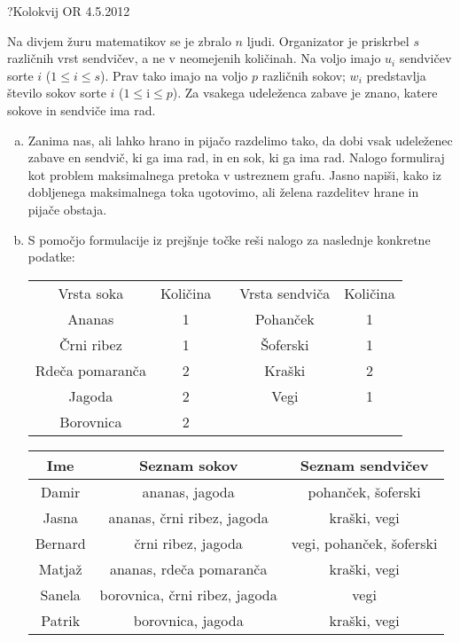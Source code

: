 \begin{naloga}{?}{Kolokvij OR 4.5.2012}
\begin{vprasanje}
Na divjem žuru matematikov se je zbralo $n$ ljudi.
Organizator je priskrbel $s$ različnih vrst sendvičev,
a ne v neomejenih količinah.
Na voljo imajo $u_i$ sendvičev sorte $i$ ($1 \le i \le s$).
Prav tako imajo na voljo $p$ različnih sokov;
$w_i$ predstavlja število sokov sorte $i$ ($1 \le $i$ \le p$).
Za vsakega udeleženca zabave je znano,
katere sokove in sendviče ima rad.

\begin{enumerate}[(a)]
\item Zanima nas, ali lahko hrano in pijačo razdelimo tako,
da dobi vsak udeleženec zabave en sendvič, ki ga ima rad,
in en sok, ki ga ima rad.
Nalogo formuliraj kot problem maksimalnega pretoka v ustreznem grafu.
Jasno napiši, kako iz dobljenega maksimalnega toka ugotovimo,
ali želena razdelitev hrane in pijače obstaja.

\item S pomočjo formulacije iz prejšnje točke
reši nalogo za naslednje konkretne podatke:
\begin{center}
\begin{tabular}{c|ccc|c}
Vrsta soka & Količina & \quad & Vrsta sendviča & Količina \\
\cline{1-2} \cline{4-5}
Ananas          & 1 && Pohanček & 1 \\
Črni ribez      & 1 && Šoferski & 1 \\
Rdeča pomaranča & 2 && Kraški   & 2 \\
Jagoda          & 2 && Vegi     & 1 \\
Borovnica       & 2
\end{tabular}

\bigskip
\begin{tabular}{c|c|c}
Ime & Seznam sokov & Seznam sendvičev \\ \hline
Damir   & ananas, jagoda                & pohanček, šoferski       \\
Jasna   & ananas, črni ribez, jagoda    & kraški, vegi             \\
Bernard & črni ribez, jagoda            & vegi, pohanček, šoferski \\
Matjaž  & ananas, rdeča pomaranča       & kraški, vegi             \\
Sanela  & borovnica, črni ribez, jagoda & vegi                     \\
Patrik  & borovnica, jagoda             & kraški, vegi
\end{tabular}
\end{center}
\end{enumerate}
\end{vprasanje}
\begin{odgovor}
\end{odgovor}
\end{naloga}


